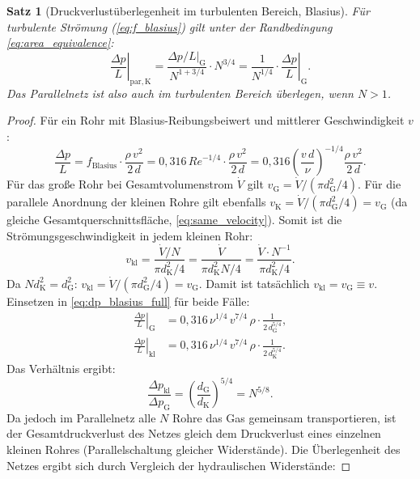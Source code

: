 ﻿\documentclass[12pt,a4paper,twoside]{article}
\theoremstyle{plain}
\newtheorem{theorem}{Satz}[section]
\theoremstyle{definition}
\theoremstyle{remark}
\newcommand{\Rey}{\mathit{Re}}
\newcommand{\dpL}{\Delta p / L}
\newcommand{\dG}{d_{\mathrm{G}}}
\newcommand{\dK}{d_{\mathrm{K}}}
\begin{document}
\begin{theorem}[Druckverlustüberlegenheit im turbulenten Bereich, Blasius]
\label{thm:druckverlust_turb}
Für turbulente Strömung (\cref{eq:f_blasius}) gilt unter der Randbedingung
\cref{eq:area_equivalence}:
\begin{equation}
  \left.\frac{\Delta p}{L}\right|_{\mathrm{par,K}}
  = \frac{\dpL|_{\mathrm{G}}}{N^{1+3/4}} \cdot N^{3/4}
  = \frac{1}{N^{1/4}} \cdot \left.\frac{\Delta p}{L}\right|_{\mathrm{G}}.
  \label{eq:blasius_ratio}
\end{equation}
Das Parallelnetz ist also auch im turbulenten Bereich überlegen, wenn $N > 1$.
\end{theorem}

\begin{proof}
Für ein Rohr mit Blasius-Reibungsbeiwert und mittlerer Geschwindigkeit $v$:
\begin{equation}
  \frac{\Delta p}{L}
    = f_{\mathrm{Blasius}} \cdot \frac{\rho\,v^2}{2\,d}
    = 0{,}316 \, \Rey^{-1/4} \cdot \frac{\rho\,v^2}{2\,d}
    = 0{,}316 \left(\frac{v\,d}{\nu}\right)^{-1/4} \frac{\rho\,v^2}{2\,d}.
  \label{eq:dp_blasius_full}
\end{equation}
Für das große Rohr bei Gesamtvolumenstrom $\dot{V}$ gilt
$v_{\mathrm{G}} = \dot{V} / (\pi\dG^2/4)$.
Für die parallele Anordnung der kleinen Rohre gilt ebenfalls
$v_{\mathrm{K}} = \dot{V} / (\pi\dG^2/4) = v_{\mathrm{G}}$ (da gleiche
Gesamtquerschnittsfläche, \cref{eq:same_velocity}).
Somit ist die Strömungsgeschwindigkeit in jedem kleinen Rohr:
\begin{equation}
  v_{\mathrm{kl}} = \frac{\dot{V}/N}{\pi\dK^2/4}
    = \frac{\dot{V}}{\pi\dK^2 N/4}
    = \frac{\dot{V} \cdot N^{-1}}{\pi \dK^2/4}.
  \label{eq:v_in_small}
\end{equation}
Da $N \dK^2 = \dG^2$:
$v_{\mathrm{kl}} = \dot{V} / (\pi\dG^2/4) = v_{\mathrm{G}}$.
Damit ist tatsächlich $v_{\mathrm{kl}} = v_{\mathrm{G}} \equiv v$.
Einsetzen in \cref{eq:dp_blasius_full} für beide Fälle:
\begin{align}
  \left.\frac{\Delta p}{L}\right|_{\mathrm{G}}
    &= 0{,}316\,\nu^{1/4}\,v^{7/4}\,\rho \cdot \frac{1}{2\,d_{\mathrm{G}}^{5/4}}, \\
  \left.\frac{\Delta p}{L}\right|_{\mathrm{kl}}
    &= 0{,}316\,\nu^{1/4}\,v^{7/4}\,\rho \cdot \frac{1}{2\,d_{\mathrm{K}}^{5/4}}.
\end{align}
Das Verhältnis ergibt:
\begin{equation}
  \frac{\Delta p_{\mathrm{kl}}}{\Delta p_{\mathrm{G}}}
    = \left(\frac{d_{\mathrm{G}}}{d_{\mathrm{K}}}\right)^{5/4}
    = N^{5/8}.
  \label{eq:dp_ratio_blasius_per_pipe}
\end{equation}
Da jedoch im Parallelnetz alle $N$ Rohre das Gas gemeinsam transportieren,
ist der Gesamtdruckverlust des Netzes gleich dem Druckverlust eines
einzelnen kleinen Rohres (Parallel\-schaltung gleicher Widerstände).
Die Überlegenheit des Netzes ergibt sich durch Vergleich der hydraulischen
Widerstände:


\end{proof}
\end{document}
